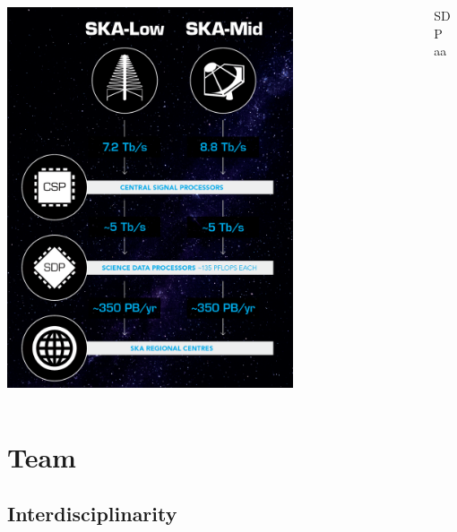 \documentclass[usenames,dvipsnames]{beamer}
\begin{document}
{{\begin{columns}[t]
    \begin{column}{.4\linewidth}
\begin{center}
\includegraphics[width=0.7\textwidth]{image002}
\end{center}
\end{column}
\begin{column}{.6\linewidth}
    \begin{block}{SDP}
        aa
    \end{block}
\end{column}
\end{columns}
}
}


\section{Team}
\subsection{Interdisciplinarity}


\end{document}
